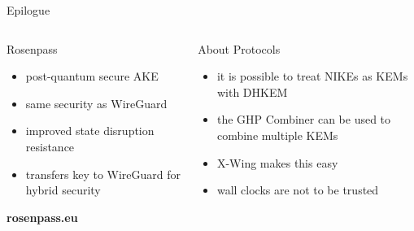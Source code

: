 
\begin{frame}[T]{Epilogue}
  \begin{columns}[fullwidth,t]
      \begin{column}{.45\linewidth}
        \begin{block}{Rosenpass\strut}
          \small
          \begin{itemize}
            \item post-quantum secure AKE
            \item same security as WireGuard
            \item improved state disruption resistance
            \item transfers key to WireGuard for hybrid security
          \end{itemize}
        \end{block}
        \vfill
        \textbf{rosenpass.eu}
      \end{column}

      \begin{column}{.45\linewidth}
        \begin{block}{About Protocols\strut}
        \small
          \begin{itemize}
            \item it is possible to treat NIKEs as KEMs with DHKEM
            \item the GHP Combiner can be used to combine multiple KEMs
            \item X-Wing makes this easy
            \item wall clocks are not to be trusted
          \end{itemize}
        \end{block}
      \end{column}
  \end{columns}
\end{frame}

